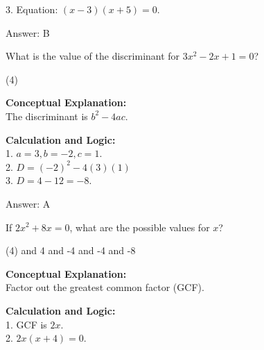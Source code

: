 \documentclass[11pt,paper=a4,answers]{exam}
\begin{document}
\begin{questions}
\begin{solution}
\vspace{10pt}

3. Equation: $(x - 3)(x + 5) = 0$.

\vspace{20pt}

Answer: \colorbox{yellow!100}{B}
\end{solution}

\vspace{30pt}

\question
What is the value of the discriminant for $3x^2 - 2x + 1 = 0$?
\begin{tasks}(4)
\end{tasks}

\begin{solution}
\textbf{Conceptual Explanation:} \\
The discriminant is $b^2 - 4ac$.

\vspace{15pt}

\textbf{Calculation and Logic:} \\
1. $a = 3, b = -2, c = 1$. \\
2. $D = (-2)^2 - 4(3)(1)$ \\
3. $D = 4 - 12 = -8$.

\vspace{20pt}

Answer: \colorbox{yellow!100}{A}
\end{solution}

\vspace{30pt}

\question
If $2x^2 + 8x = 0$, what are the possible values for $x$?
\begin{tasks}(4)
     and 4
     and -4
     and -4
     and -8
\end{tasks}

\begin{solution}
\textbf{Conceptual Explanation:} \\
Factor out the greatest common factor (GCF).

\vspace{15pt}

\textbf{Calculation and Logic:} \\
1. GCF is $2x$. \\
2. $2x(x + 4) = 0$.


\end{solution}
\end{questions}
\end{document}
